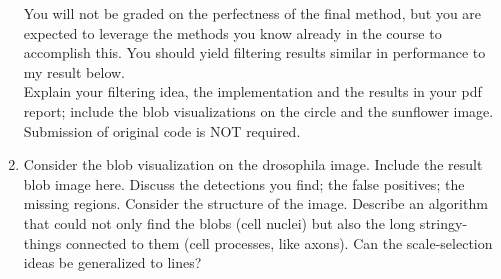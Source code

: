 \begin{enumerate}[Step 1]
		You will not be graded on the perfectness of the final method, but you are expected to leverage the methods you know already in the course to accomplish this.
		You should yield filtering results similar in performance to my result below.\\
		Explain your filtering idea, the implementation and the results in your pdf report; include the blob visualizations on the circle and the sunflower image.
		Submission of original code is NOT required.
\item Consider the blob visualization on the drosophila image.
		Include the result blob image here.
		Discuss the detections you find; the false positives; the missing regions.
		Consider the structure of the image.
		Describe an algorithm that could not only find the blobs (cell nuclei) but also the long stringy-things connected to them (cell processes, like axons).
		Can the scale-selection ideas be generalized to lines?
\end{enumerate}


